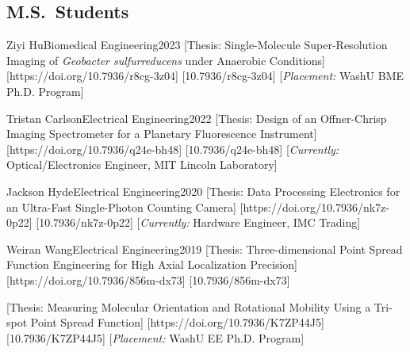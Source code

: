 \subsection*[M.S.]{M.S.\ Students}
\begin{etaremune}[
  leftmargin=9mm, 
  labelsep=1em,
  topsep=0pt, %
  itemsep=0pt %
]


\item \cvperson
  {Ziyi Hu}{Biomedical Engineering}{2023}
  [Thesis: Single-Molecule Super-Resolution Imaging of \textit{Geobacter sulfurreducens} under Anaerobic Conditions]
  [https://doi.org/10.7936/r8cg-3z04]
  [10.7936/r8cg-3z04]
  [\textit{Placement:} WashU BME Ph.D. Program]

\item \cvperson
  {Tristan Carlson}{Electrical Engineering}{2022}
  [Thesis: Design of an Offner-Chrisp Imaging Spectrometer for a Planetary Fluorescence Instrument]
  [https://doi.org/10.7936/q24e-bh48]
  [10.7936/q24e-bh48]
  [\textit{Currently:} Optical/Electronics Engineer, MIT Lincoln Laboratory]

\item \cvperson
  {Jackson Hyde}{Electrical Engineering}{2020}
  [Thesis: Data Processing Electronics for an Ultra-Fast Single-Photon Counting Camera]
  [https://doi.org/10.7936/nk7z-0p22]
  [10.7936/nk7z-0p22]
  [\textit{Currently:} Hardware Engineer, IMC Trading]

\item \cvperson
  {Weiran Wang}{Electrical Engineering}{2019}
  [Thesis: Three-dimensional Point Spread Function Engineering for High Axial Localization Precision]
  [https://doi.org/10.7936/856m-dx73]
  [10.7936/856m-dx73]

\item {}
  [Thesis: Measuring Molecular Orientation and Rotational Mobility Using a Tri-spot Point Spread Function]
  [https://doi.org/10.7936/K7ZP44J5]
  [10.7936/K7ZP44J5]
  [\textit{Placement:} WashU EE Ph.D. Program]

\end{etaremune}

